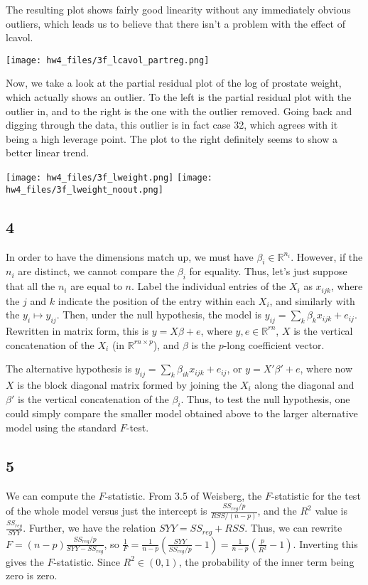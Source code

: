 \documentclass{article}
\newcommand{\rn}{\mathbb{R}}
\begin{document}
The resulting plot shows fairly good linearity without any immediately obvious outliers, which leads us to believe that there isn't a problem with the effect of lcavol.

\texttt{[image: hw4\_files/3f\_lcavol\_partreg.png]}

Now, we take a look at the partial residual plot of the log of prostate weight, which actually shows an outlier. To the left is the partial residual plot with the outlier in, and to the right is the one with the outlier removed. Going back and digging through the data, this outlier is in fact case 32, which agrees with it being a high leverage point. The plot to the right definitely seems to show a better linear trend.

\noindent\texttt{[image: hw4\_files/3f\_lweight.png]}
\texttt{[image: hw4\_files/3f\_lweight\_noout.png]}
\subsection*{4}
In order to have the dimensions match up, we must have $\beta_i\in\rn^{n_i}$. However, if the $n_i$ are distinct, we cannot compare the $\beta_i$ for equality. Thus, let's just suppose that all the $n_i$ are equal to $n$. Label the individual entries of the $X_i$ as $x_{ijk}$, where the $j$ and $k$ indicate the position of the entry within each $X_i$, and similarly with the $y_i\mapsto y_{ij}$. Then, under the null hypothesis, the model is $y_{ij}=\sum_k\beta_{k}x_{ijk}+e_{ij}$. Rewritten in matrix form, this is $y=X\beta+e$, where $y,e\in\rn^{rn}$, $X$ is the vertical concatenation of the $X_i$ (in $\rn^{rn\times p}$), and $\beta$ is the $p$-long coefficient vector. 

The alternative hypothesis is $y_{ij}=\sum_k\beta_{ik}x_{ijk}+e_{ij}$, or $y=X'\beta'+e$, where now $X$ is the block diagonal matrix formed by joining the $X_i$ along the diagonal and $\beta'$ is the vertical concatenation of the $\beta_i$. Thus, to test the null hypothesis, one could simply compare the smaller model obtained above to the larger alternative model using the standard $F$-test.
\subsection*{5}
We can compute the $F$-statistic. From 3.5 of Weisberg, the $F$-statistic for the test of the whole model versus just the intercept is $\frac{SS_{reg}/p}{RSS/(n-p)}$, and the $R^2$ value is $\frac{SS_{reg}}{SYY}$. Further, we have the relation $SYY=SS_{reg}+RSS$. Thus, we can rewrite $F=(n-p)\frac{SS_{reg}/p}{SYY-SS_{reg}}$, so $\frac{1}{F}=\frac{1}{n-p}\left(\frac{SYY}{SS_{reg}/p}-1\right)=\frac{1}{n-p}\left(\frac{p}{R^2}-1\right)$. Inverting this gives the $F$-statistic. Since $R^2\in(0,1)$, the probability of the inner term being zero is zero.
\end{document}
